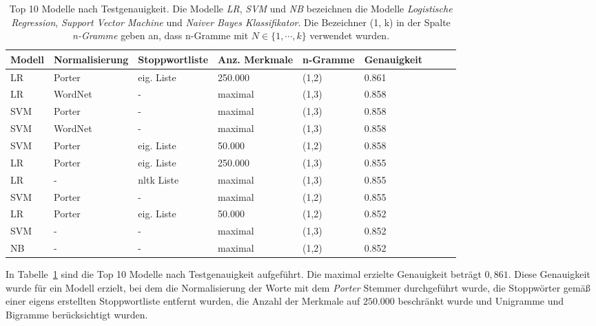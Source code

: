 \begin{table}
    \begin{tabular}{lllllllrr}
        \toprule
        Modell & Normalisierung & Stoppwortliste   & Anz. Merkmale & n-Gramme & Genauigkeit \\
        \midrule
        LR     & Porter         & eig. Liste       & 250.000       & (1,2)    & 0.861       \\
        LR     & WordNet        & -                & maximal       & (1,3)    & 0.858       \\
        SVM    & Porter         & -                & maximal       & (1,3)    & 0.858       \\
        SVM    & WordNet        & -                & maximal       & (1,3)    & 0.858       \\
        SVM    & Porter         & eig. Liste       & 50.000        & (1,2)    & 0.858       \\
        LR     & Porter         & eig. Liste       & 250.000       & (1,3)    & 0.855       \\
        LR     & -              & \gls{nltk} Liste & maximal       & (1,3)    & 0.855       \\
        SVM    & Porter         & -                & maximal       & (1,2)    & 0.855       \\
        LR     & Porter         & eig. Liste       & 50.000        & (1,2)    & 0.852       \\
        SVM    & -              & -                & maximal       & (1,3)    & 0.852       \\
        NB     & -              & -                & maximal       & (1,2)    & 0.852       \\
        \bottomrule
    \end{tabular}
    \caption{
        Top 10 Modelle nach Testgenauigkeit.
        Die Modelle \textit{LR}, \textit{SVM} und \textit{NB} bezeichnen die Modelle \textit{Logistische Regression}, \textit{Support Vector Machine} und \textit{Naiver Bayes Klassifikator}.
        Die Bezeichner (1, k) in der Spalte \textit{n-Gramme} geben an, dass n-Gramme mit $N\in\lbrace1,\cdots,k\rbrace$ verwendet wurden.
    }
    \label{tab:top-10-models}
\end{table}

In Tabelle~\ref{tab:top-10-models} sind die Top 10 Modelle nach Testgenauigkeit aufgeführt.
Die maximal erzielte Genauigkeit beträgt $0,861$.
Diese Genauigkeit wurde für ein Modell erzielt, bei dem die Normalisierung der Worte mit dem \textit{Porter} Stemmer durchgeführt wurde, die Stoppwörter gemäß einer eigens erstellten Stoppwortliste entfernt wurden, die Anzahl der Merkmale auf $250.000$ beschränkt wurde und Unigramme und Bigramme berücksichtigt wurden.

